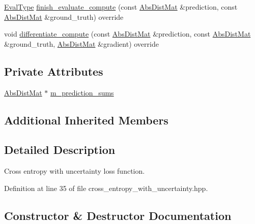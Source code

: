 \begin{DoxyCompactItemize}
\hyperlink{base_8hpp_a3266f5ac18504bbadea983c109566867}{Eval\+Type} \hyperlink{classlbann_1_1cross__entropy__with__uncertainty_abb9b240766b395dab052e3225a0888f6}{finish\+\_\+evaluate\+\_\+compute} (const \hyperlink{base_8hpp_a9a697a504ae84010e7439ffec862b470}{Abs\+Dist\+Mat} \&prediction, const \hyperlink{base_8hpp_a9a697a504ae84010e7439ffec862b470}{Abs\+Dist\+Mat} \&ground\+\_\+truth) override
\item 
void \hyperlink{classlbann_1_1cross__entropy__with__uncertainty_a48ebe2b7a2193c124df0cd15813835d0}{differentiate\+\_\+compute} (const \hyperlink{base_8hpp_a9a697a504ae84010e7439ffec862b470}{Abs\+Dist\+Mat} \&prediction, const \hyperlink{base_8hpp_a9a697a504ae84010e7439ffec862b470}{Abs\+Dist\+Mat} \&ground\+\_\+truth, \hyperlink{base_8hpp_a9a697a504ae84010e7439ffec862b470}{Abs\+Dist\+Mat} \&gradient) override
\end{DoxyCompactItemize}
\subsection*{Private Attributes}
\begin{DoxyCompactItemize}
\item 
\hyperlink{base_8hpp_a9a697a504ae84010e7439ffec862b470}{Abs\+Dist\+Mat} $\ast$ \hyperlink{classlbann_1_1cross__entropy__with__uncertainty_a4b45767c526e7ebe4a55ff1a1ddbd7ba}{m\+\_\+prediction\+\_\+sums}
\end{DoxyCompactItemize}
\subsection*{Additional Inherited Members}


\subsection{Detailed Description}
Cross entropy with uncertainty loss function. 

Definition at line 35 of file cross\+\_\+entropy\+\_\+with\+\_\+uncertainty.\+hpp.



\subsection{Constructor \& Destructor Documentation}
\mbox{\label{classlbann_1_1cross__entropy__with__uncertainty_a93f0ab9861859a3b54fc5c723a27aaaa}} 

